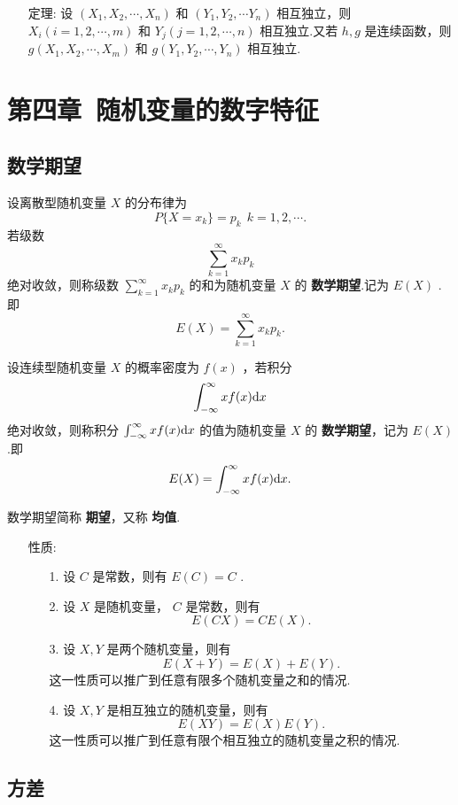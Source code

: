 \documentclass[UTF8,10pt]{ctexart}
\begin{document}
	\begin{itemize}
		\item [定理:] 设 $ (X_{1},X_{2}, \cdots ,X_{n}) $ 和 $ (Y_{1},Y_{2}, \cdots Y_{n}) $ 相互独立，则 $ X_{i}(i=1,2, \cdots ,m) $ 和 $ Y_{j}(j=1,2, \cdots ,n) $ 相互独立.又若 $ h,g $ 是连续函数，则 $ g(X_{1},X_{2}, \cdots , X_{m}) $ 和 $ g(Y_{1}, Y_{2}, \cdots ,Y_{n}) $ 相互独立.
	\end{itemize}
	
	\section{第四章\ 随机变量的数字特征}
	
	\subsection{数学期望}
	
	设离散型随机变量 $ X $ 的分布律为 $$ P\{X=x_{k}\}=p_{k}\ \ k=1,2, \cdots. $$ 若级数 $$ \sum\limits_{k=1}^{ \infty }x_{k}p_{k} $$ 绝对收敛，则称级数 $ \sum\limits_{k=1}^{ \infty }x_{k}p_{k} $ 的和为随机变量 $ X $ 的 \textbf{数学期望}.记为 $ E(X) $ .即 $$ E(X)= \sum\limits_{k=1}^{ \infty }x_{k}p_{k}. $$
	
	设连续型随机变量 $ X $ 的概率密度为 $ f(x) $ ，若积分 $$ \int_{- \infty }^{ \infty }xf(x){\rm d}x $$ 绝对收敛，则称积分 $ \int_{- \infty }^{ \infty }xf(x){\rm d}x $ 的值为随机变量 $ X $ 的 \textbf{数学期望}，记为 $ E(X) $ .即 $$ E(X)= \int_{- \infty }^{ \infty }xf(x){\rm d}x. $$
	
	数学期望简称 \textbf{期望}，又称 \textbf{均值}.
	
	\begin{itemize}
		\item [性质:] {
			\begin{enumerate}
				\item [1.] 设 $ C $ 是常数，则有 $ E(C)=C $ .
				\item [2.] 设 $ X $ 是随机变量， $ C $ 是常数，则有 $$ E(CX)=CE(X). $$
				\item [3.] 设 $ X,Y $ 是两个随机变量，则有 $$ E(X+Y)=E(X)+E(Y). $$ 这一性质可以推广到任意有限多个随机变量之和的情况.
				\item [4.] 设 $ X,Y $ 是相互独立的随机变量，则有 $$ E(XY)=E(X)E(Y). $$ 这一性质可以推广到任意有限个相互独立的随机变量之积的情况.
			\end{enumerate}
		}
	\end{itemize}
	
	\subsection{方差}
	
\end{document}

